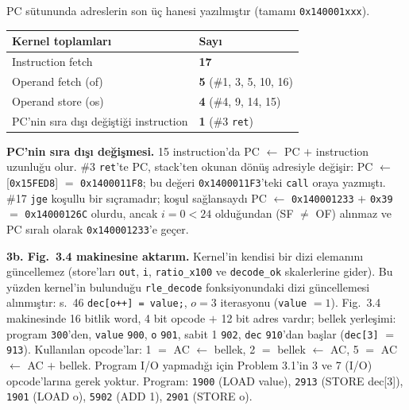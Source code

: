 \documentclass[11pt,a4paper]{article}
\newcommand{\tl}{\texttt}
\newcommand{\hd}[1]{\cellcolor{hdr}#1}
\begin{document}
PC sütununda adreslerin son üç hanesi yazılmıştır (tamamı \tl{0x140001xxx}).

\begin{longtable}{|p{11.0cm}|p{4.5cm}|}
\hline
\hd{Kernel toplamları} & \hd{Sayı}\\
\hline
Instruction fetch & \textbf{17}\\
\hline
Operand fetch (of) & \textbf{5} (\#1, 3, 5, 10, 16)\\
\hline
Operand store (os) & \textbf{4} (\#4, 9, 14, 15)\\
\hline
PC'nin sıra dışı değiştiği instruction & \textbf{1} (\#3 \tl{ret})\\
\hline
\end{longtable}

\textbf{PC'nin sıra dışı değişmesi.} 15 instruction'da PC $\leftarrow$ PC $+$ instruction
uzunluğu olur. \#3 \tl{ret}'te PC, stack'ten okunan dönüş adresiyle değişir:
PC $\leftarrow$ [\tl{0x15FED8}] $=$ \tl{0x1400011F8}; bu değeri \tl{0x1400011F3}'teki
\tl{call} oraya yazmıştı. \#17 \tl{jge} koşullu bir sıçramadır; koşul sağlansaydı PC $\leftarrow$
\tl{0x140001233} $+$ \tl{0x39} $=$ \tl{0x14000126C} olurdu, ancak $i = 0 < 24$ olduğundan
(SF $\ne$ OF) alınmaz ve PC sıralı olarak \tl{0x140001233}'e geçer.

\textbf{3b. Fig.~3.4 makinesine aktarım.} Kernel'in kendisi bir dizi elemanını güncellemez
(store'ları \tl{out}, \tl{i}, \tl{ratio\_x100} ve \tl{decode\_ok} skalerlerine gider). Bu yüzden
kernel'in bulunduğu \tl{rle\_decode} fonksiyonundaki dizi güncellemesi alınmıştır: s.~46
\tl{dec[o++] = value;}, $o = 3$ iterasyonu (\tl{value} $= 1$). Fig.~3.4 makinesinde
16 bitlik word, 4 bit opcode $+$ 12 bit adres vardır; bellek yerleşimi: program \tl{300}'den,
\tl{value} \tl{900}, \tl{o} \tl{901}, sabit 1 \tl{902}, \tl{dec} \tl{910}'dan başlar
(\tl{dec[3]} $=$ \tl{913}). Kullanılan opcode'lar: 1 $=$ AC $\leftarrow$ bellek, 2 $=$ bellek
$\leftarrow$ AC, 5 $=$ AC $\leftarrow$ AC $+$ bellek. Program I/O yapmadığı için Problem 3.1'in
3 ve 7 (I/O) opcode'larına gerek yoktur. Program: \tl{1900} (LOAD value), \tl{2913} (STORE
dec[3]), \tl{1901} (LOAD o), \tl{5902} (ADD 1), \tl{2901} (STORE o).
\end{document}
